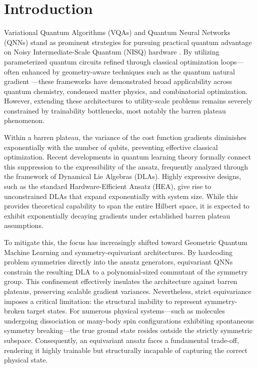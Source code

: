 \documentclass[10pt,twocolumn]{article}
\theoremstyle{remark}
\begin{document}
\clearpage
\section{Introduction}

Variational Quantum Algorithms (VQAs) and Quantum Neural Networks (QNNs) stand as prominent strategies for pursuing practical quantum advantage on Noisy Intermediate-Scale Quantum (NISQ) hardware \cite{preskill2018quantum,cerezo2021variational,peruzzo2014variational,farhi2014quantum,biamonte2017quantum}. By utilizing parameterized quantum circuits refined through classical optimization loops---often enhanced by geometry-aware techniques such as the quantum natural gradient \cite{stokes2020quantum}---these frameworks have demonstrated broad applicability across quantum chemistry, condensed matter physics, and combinatorial optimization. However, extending these architectures to utility-scale problems remains severely constrained by trainability bottlenecks, most notably the barren plateau phenomenon.

Within a barren plateau, the variance of the cost function gradients diminishes exponentially with the number of qubits, preventing effective classical optimization. Recent developments in quantum learning theory formally connect this suppression to the expressibility of the ansatz, frequently analyzed through the framework of Dynamical Lie Algebras (DLAs). Highly expressive designs, such as the standard Hardware-Efficient Ansatz (HEA), give rise to unconstrained DLAs that expand exponentially with system size. While this provides theoretical capability to span the entire Hilbert space, it is expected to exhibit exponentially decaying gradients under established barren plateau assumptions.

To mitigate this, the focus has increasingly shifted toward Geometric Quantum Machine Learning and symmetry-equivariant architectures. By hardcoding problem symmetries directly into the ansatz generators, equivariant QNNs constrain the resulting DLA to a polynomial-sized commutant of the symmetry group. This confinement effectively insulates the architecture against barren plateaus, preserving scalable gradient variances. Nevertheless, strict equivariance imposes a critical limitation: the structural inability to represent symmetry-broken target states. For numerous physical systems---such as molecules undergoing dissociation or many-body spin configurations exhibiting spontaneous symmetry breaking---the true ground state resides outside the strictly symmetric subspace. Consequently, an equivariant ansatz faces a fundamental trade-off, rendering it highly trainable but structurally incapable of capturing the correct physical state.
\end{document}
